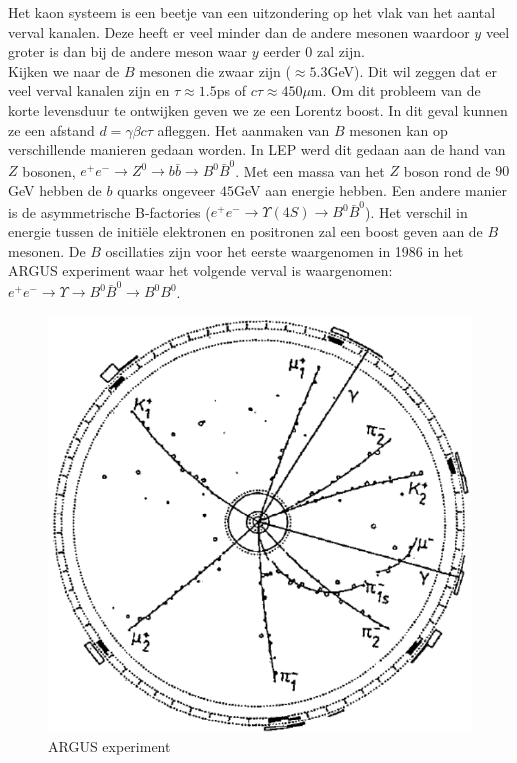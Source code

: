 \documentclass[../main.tex]{subfiles}
\begin{document}
Het kaon systeem is een beetje van een uitzondering op het vlak van het aantal verval kanalen. Deze heeft er veel minder dan de andere mesonen waardoor $y$ veel groter is dan bij de andere meson waar $y$ eerder 0 zal zijn.\\
Kijken we naar de $B$ mesonen die zwaar zijn ($\approx 5.3$GeV). Dit wil zeggen dat er veel verval kanalen zijn en $\tau \approx 1.5$ps of $c\tau \approx 450\mu$m. Om dit probleem van de korte levensduur te ontwijken geven we ze een Lorentz boost. In dit geval kunnen ze een afstand $d=\gamma\beta c\tau$ afleggen. Het aanmaken van $B$ mesonen kan op verschillende manieren gedaan worden. In LEP werd dit gedaan aan de hand van $Z$ bosonen, $e^{+} e^{-} \rightarrow Z^{0} \rightarrow b \bar{b} \rightarrow B^{0} \bar{B}^{0}$. Met een massa van het $Z$ boson rond de $90$GeV hebben de $b$ quarks ongeveer $45$GeV aan energie hebben. Een andere manier is de asymmetrische B-factories ($e^{+} e^{-} \rightarrow \Upsilon(4 S) \rightarrow B^{0} \bar{B}^{0}$). Het verschil in energie tussen de initiële elektronen en positronen zal een boost geven aan de $B$ mesonen. De $B$ oscillaties zijn voor het eerste waargenomen in 1986 in het ARGUS experiment waar het volgende verval is waargenomen: $e^{+} e^{-} \rightarrow \Upsilon \rightarrow B^{0} \bar{B}^{0} \rightarrow B^{0} B^{0}$.

\begin{figure}[h]
    \centering
    \includegraphics[width=0.4\linewidth]{meson_mixing_and_oscillations/argus.png}
    \caption{ARGUS experiment}%
    \label{fig:meson_mixing_and_oscillations/argus}
\end{figure}
\end{document}

